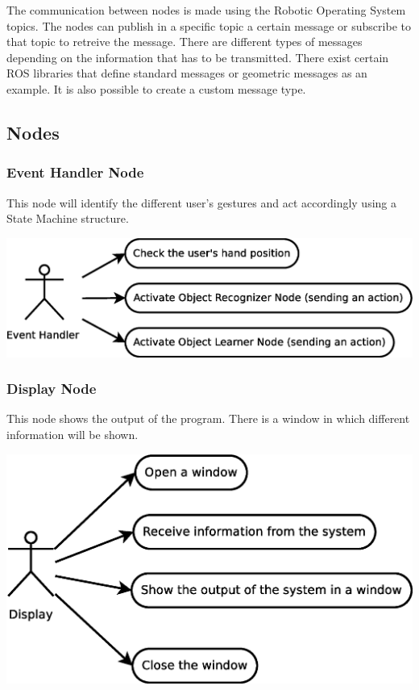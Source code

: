 \documentclass{article}
\begin{document}
The communication between nodes is made using the Robotic Operating System topics. The nodes can publish in a specific topic a certain message or subscribe to that topic to retreive the message. 
There are different types of messages depending on the information that has to be transmitted. There exist certain ROS libraries that define standard messages or geometric messages as an example. It is also possible to create a custom message type. 


\subsection{Nodes}


\subsubsection{Event Handler Node}
	This node will identify the different user's gestures and act accordingly using a State Machine structure. 
	\begin{center}
		\includegraphics[scale=0.4]{../diagrams/images/uc_event_handler.eps}
	\end{center}
	
\subsubsection{Display Node}
This node shows the output of the program. There is a window in which different information will be shown. 
	\begin{center}
		\includegraphics[scale=0.4]{../diagrams/images/uc_display.eps}
	\end{center}
	
\end{document}
